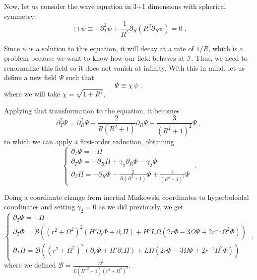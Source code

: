 Now, let us consider the wave equation in 3+1 dimensions with spherical symmetry:
%
\begin{equation}
    \Box \psi \equiv - \partial_T^2 \psi + \frac{1}{R^2} \partial_R\left( R^2 \partial_R \psi\right) = 0 \;.
\end{equation}

Since $\psi$ is a solution to this equation, it will decay at a rate of $1/R$, which is a problem because we want to know how our field behaves at $\mathscr{I}$. Thus, we need to renormalize this field so it does not vanish at infinity. With this in mind, let us define a new field $\Psi$ such that
%
\begin{equation}
    \Psi \equiv \chi \, \psi \; ,
\end{equation}
%
where we will take $\chi = \sqrt{1+R^2}$.

Applying that transformation to the equation, it becomes
%
\begin{equation}
    \partial_T^2 \Psi = \partial_R^2\Psi + \frac{2}{R(R^2+1)} \partial_R\Psi - \frac{3}{(R^2+1)^2} \Psi \;,
\end{equation}
%
to which we can apply a first-order reduction, obtaining
%
\begin{equation}
    \left\{ \begin{array}{l} 
        \partial_T \Psi = - \Pi \\ 
        \partial_T \Phi = - \partial_R \Pi + \gamma_2 \partial_R \Psi - \gamma_2\Phi\\
        \partial_T \Pi = - \partial_R \Phi - \frac{2}{R(R^2+1)}\Phi + \frac{3}{(R^2+1)^2} \Psi
    \end{array} \right. \; .
\end{equation}

Doing a coordinate change from inertial Minkowski coordinates to hyperboloidal coordinates and setting $\gamma_2 = 0$ as we did previously, we get
%
\begin{equation}
    \left\{ \begin{array}{l} 
        \partial_T \Psi = - \Pi \\ 
        \partial_T \Phi = \mathcal{B}\left((r^2 + \Omega^2)^2 \left(H' \partial_r \Phi + \partial_r\Pi\right) + H' L \Omega \left( 2r\Phi - 3 \Omega \Psi + 2 r^{-1} \Omega^2 \Phi\right)\right)\\
        \partial_T \Pi = \mathcal{B}\left((r^2 + \Omega^2)^2 \left(\partial_r \Phi + H' \partial_r\Pi\right) + L \Omega \left( 2r\Phi - 3 \Omega \Psi + 2 r^{-1} \Omega^2 \Phi\right)\right)
    \end{array} \right. \; ,
\end{equation}
where we defined $\mathcal{B}= \frac{\Omega^2}{L(H'^{\,2}-1)(r^2 + \Omega^2)^2}$. 

